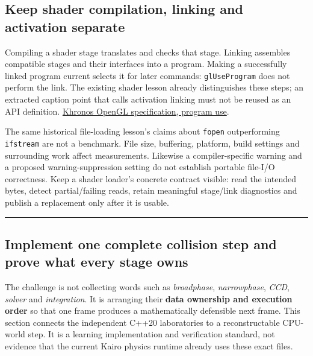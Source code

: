 \subsection{Keep shader compilation, linking and activation separate}\label{06-engine-ii-ch046-keep-shader-compilation-linking-and-activation-separate}

Compiling a shader stage translates and checks that stage. Linking assembles compatible stages and their interfaces into a program. Making a successfully linked program current selects it for later commands: \texttt{glUseProgram} does not perform the link. The existing shader lesson already distinguishes these steps; an extracted caption point that calls activation linking must not be reused as an API definition. \href{https://registry.khronos.org/OpenGL/specs/gl/glspec46.compatibility.pdf}{Khronos OpenGL specification, program use}.

The same historical file-loading lesson's claims about \texttt{fopen} outperforming \texttt{ifstream} are not a benchmark. File size, buffering, platform, build settings and surrounding work affect measurements. Likewise a compiler-specific warning and a proposed warning-suppression setting do not establish portable file-I/O correctness. Keep a shader loader's concrete contract visible: read the intended bytes, detect partial/failing reads, retain meaningful stage/link diagnostics and publish a replacement only after it is usable.

\begin{center}\rule{0.5\linewidth}{0.5pt}\end{center}

\subsection{Implement one complete collision step and prove what every stage owns}\label{06-engine-ii-ch046-implement-one-complete-collision-step-and-prove-what-every-stage-owns}

The challenge is not collecting words such as \emph{broadphase}, \emph{narrowphase}, \emph{CCD}, \emph{solver} and \emph{integration}. It is arranging their \textbf{data ownership and execution order} so that one frame produces a mathematically defensible next frame. This section connects the independent C++20 laboratories to a reconstructable CPU-world step. It is a learning implementation and verification standard, not evidence that the current Kairo physics runtime already uses these exact files.

